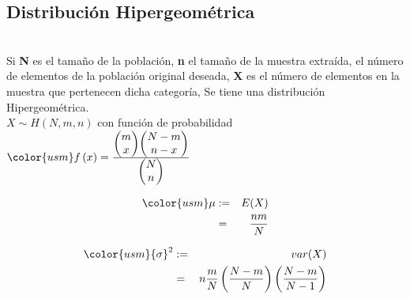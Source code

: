     \subsection{Distribución Hipergeométrica}\\
    
    Si \textbf{N} es el tamaño de la población, \textbf{n} el tamaño de la muestra extraída,  el número de elementos de la población original deseada, \textbf{X} es el número de elementos en la muestra que pertenecen dicha categoría, Se tiene una distribución Hipergeométrica.\\
    
    $ X \sim H(N,m,n) $ con función de probabilidad ${\color{usm} f\left( x \right) =\frac { \left( \begin{matrix} m \\ x \end{matrix} \right) \left( \begin{matrix} N-m \\ n-x \end{matrix} \right)  }{ \left( \begin{matrix} N \\ n \end{matrix} \right)  } }$
    
     \begin{minipage}[b]{\textwidth}
\begin{minipage}[b]{0.5 \textwidth}
 \begin{eqnarray*}
        {\color{usm}\mu} & := & E(X) & \\
                            & = & \frac{nm}{N}
    \end{eqnarray*}
\end{minipage} \hfill \begin{minipage}[b]{0.5 \textwidth}
\begin{eqnarray*}
        {\color{usm}{ \sigma  }^{ 2 }} & := &  var(X) \\
                                        & = & n\frac { m }{ N } \left( \frac { N-m }{ N }  \right) \left( \frac { N-m }{ N-1 }  \right) 
    \end{eqnarray*}
\end{minipage}
\end{minipage}

\newpage